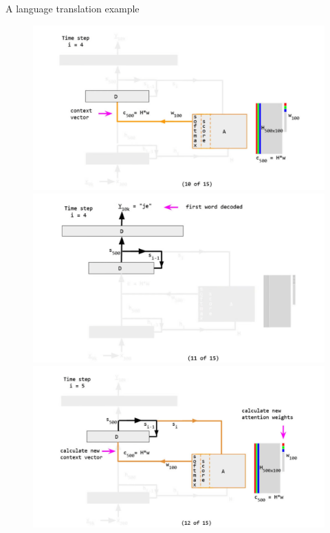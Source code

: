 \documentclass[
  notheorems,
  aspectratio=54,
]{beamer}
\begin{document}
\begin{frame}{A language translation example}
\begin{figure}
  \begin{minipage}[b]{0.4\textwidth}
    \par\medskip
    \includegraphics[width=1.3\textwidth]{./translation/10.jpg}
  \end{minipage}
  \hfill
  \begin{minipage}[b]{0.4\textwidth}
    \par\medskip
    \includegraphics[width=1.3\textwidth]{./translation/11.jpg}
  \end{minipage}
  \begin{minipage}[b]{0.4\textwidth}
    \par\medskip
    \includegraphics[width=1.3\textwidth]{./translation/12.jpg}
  \end{minipage}
\end{figure}
\end{frame}
\end{document}
